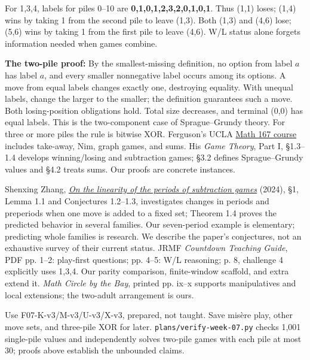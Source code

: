 \documentclass[11pt]{article}
\begin{document}
\newpage
{}
For 1,3,4, labels for piles 0--10 are \textbf{0,1,0,1,2,3,2,0,1,0,1}. Thus (1,1) loses; (1,4) wins by taking 1 from the second pile to leave (1,3). Both (1,3) and (4,6) lose; (5,6) wins by taking 1 from the first pile to leave (4,6). W/L status alone forgets information needed when games combine.

\textbf{The two-pile proof:} By the smallest-missing definition, no option from label \(a\) has label \(a\), and every smaller nonnegative label occurs among its options. A move from equal labels changes exactly one, destroying equality. With unequal labels, change the larger to the smaller; the definition guarantees such a move. Both losing-position obligations hold. Total size decreases, and terminal (0,0) has equal labels. This is the two-component case of Sprague--Grundy theory. For three or more piles the rule is bitwise XOR.
Ferguson's UCLA \href{https://www.math.ucla.edu/~tom/GameTheory.html}{Math 167 course} includes take-away, Nim, graph games, and sums. His \emph{Game Theory}, Part I, \S1.3--1.4 develops winning/losing and subtraction games; \S3.2 defines Sprague--Grundy values and \S4.2 treats sums. Our proofs are concrete instances.

Shenxing Zhang, \href{https://zhangshenxing.github.io/publications/Zhang2024tcs%20On%20the%20linearity%20of%20the%20periods%20of%20subtraction%20games.pdf}{\emph{On the linearity of the periods of subtraction games}} (2024), \S1, Lemma 1.1 and Conjectures 1.2--1.3, investigates changes in periods and preperiods when one move is added to a fixed set; Theorem 1.4 proves the predicted behavior in several families. Our seven-period example is elementary; predicting whole families is research. We describe the paper's conjectures, not an exhaustive survey of their current status.
JRMF \emph{Countdown Teaching Guide}, PDF pp. 1--2: play-first questions; pp. 4--5: W/L reasoning; p. 8, challenge 4 explicitly uses 1,3,4. Our parity comparison, finite-window scaffold, and extra extend it. \emph{Math Circle by the Bay}, printed pp. ix--x supports manipulatives and local extensions; the two-adult arrangement is ours.

Use F07-K-v3/M-v3/U-v3/X-v3, prepared, not taught. Save mis\`ere play, other move sets, and three-pile XOR for later. \texttt{plans/verify-week-07.py} checks 1,001 single-pile values and independently solves two-pile games with each pile at most 30; proofs above establish the unbounded claims.
\end{document}
